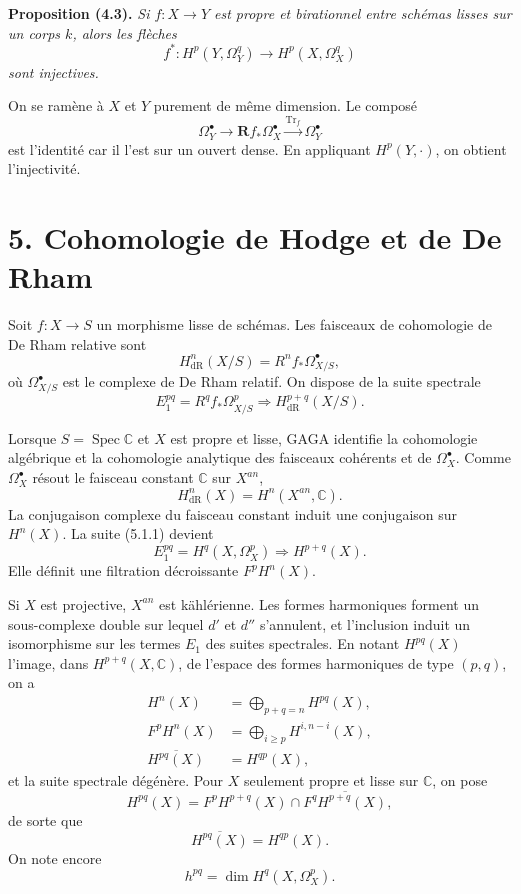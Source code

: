 \documentclass[11pt]{article}
\DeclareMathOperator{\Spec}{Spec}
\DeclareMathOperator{\Tr}{Tr}
\newcommand{\bR}{\mathbf R}
\newcommand{\C}{\mathbb C}
\newenvironment{named}[1]{\par\medskip\noindent\textbf{#1}\itshape}{\par\medskip}
\begin{document}
\begin{named}{Proposition (4.3).}
Si $f:X\to Y$ est propre et birationnel entre schémas lisses sur un corps $k$, alors les flèches
\[
f^*:H^p(Y,\Omega^q_Y)\longrightarrow H^p(X,\Omega^q_X)
\]
sont injectives.
\end{named}
On se ramène à $X$ et $Y$ purement de même dimension. Le composé
\[
\Omega^\bullet_Y\longrightarrow \bR f_*\Omega^\bullet_X\xrightarrow{\Tr_f}\Omega^\bullet_Y
\]
est l'identité car il l'est sur un ouvert dense. En appliquant $H^p(Y,\cdot)$, on obtient l'injectivité.

\section*{5. Cohomologie de Hodge et de De Rham}
Soit $f:X\to S$ un morphisme lisse de schémas. Les faisceaux de cohomologie de De Rham relative sont
\[
H^n_{\mathrm{dR}}(X/S)=R^nf_*\Omega^\bullet_{X/S},
\]
où $\Omega^\bullet_{X/S}$ est le complexe de De Rham relatif. On dispose de la suite spectrale
\begin{equation}\tag{5.1.1}
E_1^{pq}=R^qf_*\Omega^p_{X/S}\Longrightarrow H^{p+q}_{\mathrm{dR}}(X/S).
\end{equation}

Lorsque $S=\Spec\C$ et $X$ est propre et lisse, GAGA identifie la cohomologie algébrique et la cohomologie analytique des faisceaux cohérents et de $\Omega^\bullet_X$. Comme $\Omega^\bullet_X$ résout le faisceau constant $\C$ sur $X^{an}$,
\[
H^n_{\mathrm{dR}}(X)=H^n(X^{an},\C).
\]
La conjugaison complexe du faisceau constant induit une conjugaison sur $H^n(X)$. La suite (5.1.1) devient
\begin{equation}\tag{5.2.1}
E_1^{pq}=H^q(X,\Omega^p_X)\Longrightarrow H^{p+q}(X).
\end{equation}
Elle définit une filtration décroissante $F^pH^n(X)$.

Si $X$ est projective, $X^{an}$ est kählérienne. Les formes harmoniques forment un sous-complexe double sur lequel $d'$ et $d''$ s'annulent, et l'inclusion induit un isomorphisme sur les termes $E_1$ des suites spectrales. En notant $H^{pq}(X)$ l'image, dans $H^{p+q}(X,\C)$, de l'espace des formes harmoniques de type $(p,q)$, on a
\begin{align}\tag{5.2.2}
H^n(X)&=\bigoplus_{p+q=n}H^{pq}(X),\\
\tag{5.2.3}F^pH^n(X)&=\bigoplus_{i\ge p}H^{i,n-i}(X),\\
\tag{5.2.4}\overline{H^{pq}(X)}&=H^{qp}(X),
\end{align}
et la suite spectrale dégénère. Pour $X$ seulement propre et lisse sur $\C$, on pose
\begin{equation}\tag{5.2.5}
H^{pq}(X)=F^pH^{p+q}(X)\cap \overline{F^qH^{p+q}(X)},
\end{equation}
de sorte que
\begin{equation}\tag{5.2.6}
\overline{H^{pq}(X)}=H^{qp}(X).
\end{equation}
On note encore
\begin{equation}\tag{5.2.7}
h^{pq}=\dim H^q(X,\Omega^p_X).
\end{equation}
\end{document}
